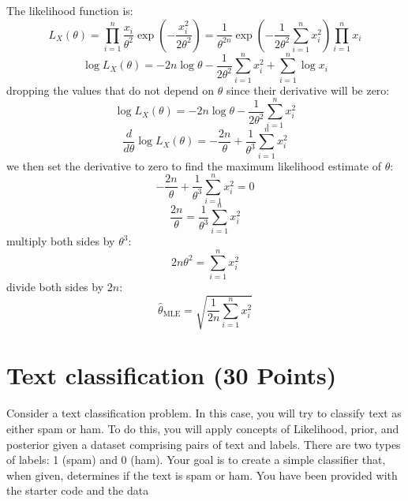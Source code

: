 \documentclass[a3paper,12pt]{article} %
\begin{document}
\begin{itemize}
    The likelihood function is:
    \[
    L_X(\theta) = \prod_{i=1}^n \frac{x_i}{\theta^2} \exp\left(-\frac{x_i^2}{2\theta^2}\right) = \frac{1}{\theta^{2n}} \exp\left(-\frac{1}{2\theta^2} \sum_{i=1}^n x_i^2\right) \prod_{i=1}^n x_i
    \]
    \[
    \log L_X(\theta) = -2n \log \theta - \frac{1}{2\theta^2} \sum_{i=1}^n x_i^2 + \sum_{i=1}^n \log x_i
    \]
    dropping the values that do not depend on \( \theta \) since their derivative will be zero:
    \[
    \log L_X(\theta) = -2n \log \theta - \frac{1}{2\theta^2} \sum_{i=1}^n x_i^2
    \]
    \[
    \frac{d}{d\theta} \log L_X(\theta) = -\frac{2n}{\theta} + \frac{1}{\theta^3} \sum_{i=1}^n x_i^2
    \]
    we then set the derivative to zero to find the maximum likelihood estimate of \( \theta \):
    \[
        -\frac{2n}{\theta} + \frac{1}{\theta^3} \sum_{i=1}^n x_i^2 = 0
    \]
    \[
        \frac{2n}{\theta} = \frac{1}{\theta^3} \sum_{i=1}^n x_i^2
    \]
    multiply both sides by \( \theta^3 \):
    \[
        2n\theta^2 = \sum_{i=1}^n x_i^2
    \]
    divide both sides by \( 2n \):
    \[
        \hat{\theta}_{\text{MLE}} = \sqrt{\frac{1}{2n} \sum_{i=1}^n x_i^2}
    \]
\end{itemize}

\section{Text classification (30 Points)}
Consider a text classification problem. In this case, you will try to classify text as either spam or ham. To do this, you will apply concepts of Likelihood, prior, and posterior given a dataset comprising pairs of text and labels. There are two types of labels: 1 (spam) and 0 (ham). Your goal is to create a simple classifier that, when given, determines if the text is spam or ham. You have been provided with the starter code and the data\\
\end{document}
